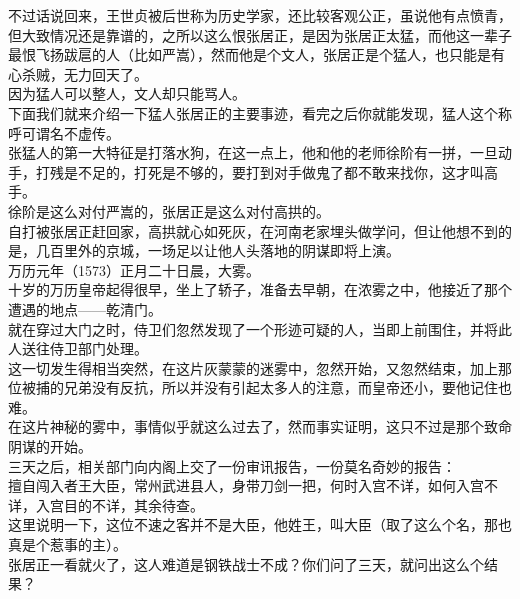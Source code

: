\begin{multicols}{\theparacolNo}
不过话说回来，王世贞被后世称为历史学家，还比较客观公正，虽说他有点愤青，但大致情况还是靠谱的，之所以这么恨张居正，是因为张居正太猛，而他这一辈子最恨飞扬跋扈的人（比如严嵩），然而他是个文人，张居正是个猛人，也只能是有心杀贼，无力回天了。\\

因为猛人可以整人，文人却只能骂人。\\

下面我们就来介绍一下猛人张居正的主要事迹，看完之后你就能发现，猛人这个称呼可谓名不虚传。\\

张猛人的第一大特征是打落水狗，在这一点上，他和他的老师徐阶有一拼，一旦动手，打残是不足的，打死是不够的，要打到对手做鬼了都不敢来找你，这才叫高手。\\

徐阶是这么对付严嵩的，张居正是这么对付高拱的。\\

自打被张居正赶回家，高拱就心如死灰，在河南老家埋头做学问，但让他想不到的是，几百里外的京城，一场足以让他人头落地的阴谋即将上演。\\

万历元年（1573）正月二十日晨，大雾。\\

十岁的万历皇帝起得很早，坐上了轿子，准备去早朝，在浓雾之中，他接近了那个遭遇的地点——乾清门。\\

就在穿过大门之时，侍卫们忽然发现了一个形迹可疑的人，当即上前围住，并将此人送往侍卫部门处理。\\

这一切发生得相当突然，在这片灰蒙蒙的迷雾中，忽然开始，又忽然结束，加上那位被捕的兄弟没有反抗，所以并没有引起太多人的注意，而皇帝还小，要他记住也难。\\

在这片神秘的雾中，事情似乎就这么过去了，然而事实证明，这只不过是那个致命阴谋的开始。\\

三天之后，相关部门向内阁上交了一份审讯报告，一份莫名奇妙的报告：\\

擅自闯入者王大臣，常州武进县人，身带刀剑一把，何时入宫不详，如何入宫不详，入宫目的不详，其余待查。\\

这里说明一下，这位不速之客并不是大臣，他姓王，叫大臣（取了这么个名，那也真是个惹事的主）。\\

张居正一看就火了，这人难道是钢铁战士不成？你们问了三天，就问出这么个结果？\\


\end{multicols}
